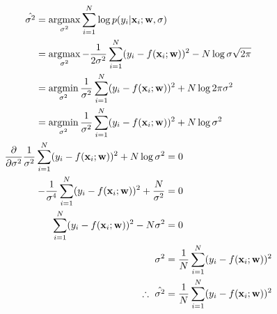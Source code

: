 \documentclass{introtosml}
\begin{document}
\begin{p}
  \item
    \begin{gather*}
      \begin{aligned}
        \hat{\sigma^2}
        & = \argmax_{\sigma^2} \sum_{i=1}^N \log p(y_i|\vec{x}_i; \vec{w}, \sigma) \\
        & = \argmax_{\sigma^2} - \frac{1}{2 \sigma^2}
            \sum_{i=1}^N (y_i - f(\vec{x}_i; \vec{w}))^2 - N \log \sigma \sqrt{2 \pi} \\
        & = \argmin_{\sigma^2} \frac{1}{\sigma^2}
            \sum_{i=1}^N (y_i - f(\vec{x}_i; \vec{w}))^2 + N \log 2 \pi \sigma^2 \\
        & = \argmin_{\sigma^2} \frac{1}{\sigma^2}
            \sum_{i=1}^N (y_i - f(\vec{x}_i; \vec{w}))^2 + N \log \sigma^2
      \end{aligned} \\
      \begin{aligned}
      \frac{\partial}{\partial \sigma^2} \frac{1}{\sigma^2}
          \sum_{i=1}^N (y_i - f(\vec{x}_i; \vec{w}))^2 + N \log \sigma^2 & = 0 \\
      - \frac{1}{\sigma^4}
          \sum_{i=1}^N (y_i - f(\vec{x}_i; \vec{w}))^2 + \frac{N}{\sigma^2} & = 0 \\
      \sum_{i=1}^N (y_i - f(\vec{x}_i; \vec{w}))^2 - N \sigma^2 & = 0 \\
      \sigma^2 & = \frac{1}{N} \sum_{i=1}^N (y_i - f(\vec{x}_i; \vec{w}))^2 \\
      \therefore \hat{\sigma^2} & = \frac{1}{N} \sum_{i=1}^N (y_i - f(\vec{x}_i; \vec{w}))^2
      \end{aligned}
    \end{gather*}


\end{p}
\end{document}
